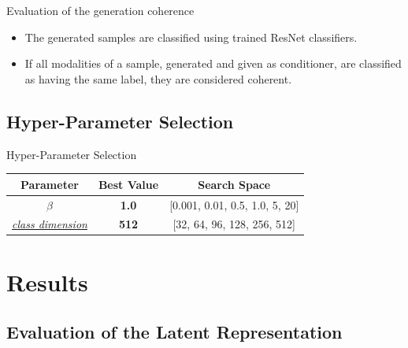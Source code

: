     \begin{frame}{Evaluation of the generation coherence}
    \begin{itemize}
        \item The generated samples are classified using trained ResNet classifiers.
        \pause
        \item If all modalities of a sample, generated and given as conditioner, are classified as having the same label, they are considered coherent.
    \end{itemize}
    \end{frame}
    
    \subsection{Hyper-Parameter Selection}
    \begin{frame}{Hyper-Parameter Selection}
        \begin{center}
        \begin{table}[]

        \begin{tabular}{ c c c }
         Parameter & Best Value & Search Space \\ 
         \midrule
         $\beta$ & \textbf{1.0} & [0.001, 0.01, 0.5, 1.0, 5, 20] \\  
         \hyperlink{mopoe_graph}{\textit{class dimension}} & \textbf{512} & [32, 64, 96, 128, 256, 512]    
        \end{tabular}
        \end{table}
        \end{center}

    \end{frame}
    
    
    \section{Results}

    \subsection{Evaluation of the Latent Representation}
    
